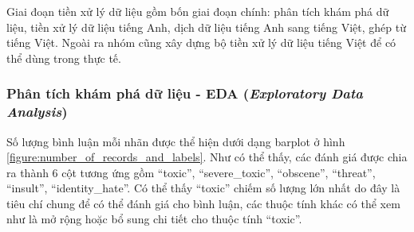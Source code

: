 Giai đoạn tiền xử lý dữ liệu gồm bốn giai đoạn chính: phân tích khám phá dữ liệu, tiền xử lý dữ liệu tiếng Anh, dịch dữ liệu tiếng Anh sang tiếng Việt, ghép từ tiếng Việt. Ngoài ra nhóm cũng xây dựng bộ tiền xử lý dữ liệu tiếng Việt để có thể dùng trong thực tế.

\subsubsection{Phân tích khám phá dữ liệu - EDA (\textit{Exploratory Data Analysis})}
Số lượng bình luận mỗi nhãn được thể hiện dưới dạng barplot ở hình \ref{figure:number_of_records_and_labels}. Như có thể thấy, các đánh giá được chia ra thành 6 cột tương ứng gồm ``toxic'', ``severe\_toxic'', ``obscene'', ``threat'', ``insult'', ``identity\_hate''. Có thể thấy ``toxic'' chiếm số lượng lớn nhất do đây là tiêu chí chung để có thể đánh giá cho bình luận, các thuộc tính khác có thể xem như là mở rộng hoặc bổ sung chi tiết cho thuộc tính ``toxic''.

